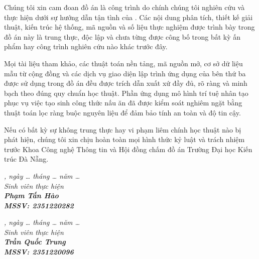 \begin{declaration}

Chúng tôi xin cam đoan đồ án  là công trình do chính chúng tôi nghiên cứu và thực hiện dưới sự hướng dẫn tận tình của \dauGVHD. Các nội dung phân tích, thiết kế giải thuật, kiến trúc hệ thống, mã nguồn và số liệu thực nghiệm được trình bày trong đồ án này là trung thực, độc lập và chưa từng được công bố trong bất kỳ ấn phẩm hay công trình nghiên cứu nào khác trước đây.

Mọi tài liệu tham khảo, các thuật toán nền tảng, mã nguồn mở, cơ sở dữ liệu mẫu từ cộng đồng và các dịch vụ giao diện lập trình ứng dụng  của bên thứ ba được sử dụng trong đồ án đều được trích dẫn xuất xứ đầy đủ, rõ ràng và minh bạch theo đúng quy chuẩn học thuật. Phần ứng dụng mô hình trí tuệ nhân tạo  phục vụ việc tạo sinh công thức nấu ăn đã được kiểm soát nghiêm ngặt bằng thuật toán lọc ràng buộc nguyên liệu để đảm bảo tính an toàn và độ tin cậy.

Nếu có bất kỳ sự không trung thực hay vi phạm liêm chính học thuật nào bị phát hiện, chúng tôi xin chịu hoàn toàn mọi hình thức kỷ luật và trách nhiệm trước Khoa Công nghệ Thông tin và Hội đồng chấm đồ án Trường Đại học Kiến trúc Đà Nẵng.

\vspace{1.4em}
\noindent\begin{minipage}[t]{0.48\textwidth}
\centering\itshape \dauNoi, ngày \dots{} tháng \dots{} năm \dots\\[2pt]
Sinh viên thực hiện\\[1.8cm]
\upshape\bfseries Phạm Tấn Hào\\[2pt]
\footnotesize\normalfont MSSV: 2351220282
\end{minipage}\hfill
\begin{minipage}[t]{0.48\textwidth}
\centering\itshape \dauNoi, ngày \dots{} tháng \dots{} năm \dots\\[2pt]
Sinh viên thực hiện\\[1.8cm]
\upshape\bfseries Trần Quốc Trung\\[2pt]
\footnotesize\normalfont MSSV: 2351220096
\end{minipage}

\end{declaration}

